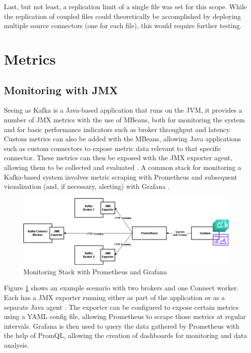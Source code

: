 Last, but not least, a replication limit of a single file was set for this scope. While the replication of coupled files could theoretically be accomplished by deploying multiple source connectors (one for each file), this would require further testing.

\section{Metrics}
\label{ch04:pipelinedevelopment:metrics}

\subsection{Monitoring with JMX}
Seeing as Kafka is a Java-based application that runs on the \ac{JVM}, it provides a number of \ac{JMX} metrics with the use of \ac{MBeans}, both for monitoring the system and for basic performance indicators such as broker throughput and latency. Custom metrics can also be added with the \ac{MBeans}, allowing Java applications such as custom connectors to expose metric data relevant to that specific connector. These metrics can then be exposed with the \ac{JMX} exporter agent, allowing them to be collected and evaluated \cite{kafkamonitoringgrafana}. A common stack for monitoring a Kafka-based system involves metric scraping with Prometheus and subsequent visualization (and, if necessary, alerting) with Grafana \cite{applicationmonitoringkafka}.

\begin{figure}[htbp]
 \centering
 \includegraphics[width=1\textwidth]{chapters/images/kafka prometheus monitoring stack.png}
 \caption{Monitoring Stack with Prometheus and Grafana}
 \label{fig:chapter04:metrics:prometheusstack}
\end{figure}

Figure \ref{fig:chapter04:metrics:prometheusstack} shows an example scenario with two brokers and one Connect worker. Each has a \ac{JMX} exporter running either as part of the application or as a separate Java agent \cite{kafkamonitoringgrafana}. The exporter can be configured to expose certain metrics using a YAML config file, allowing Prometheus to scrape those metrics at regular intervals. Grafana is then used to query the data gathered by Prometheus with the help of \ac{PromQL}, allowing the creation of dashboards for monitoring and data analysis.

